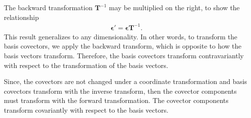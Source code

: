 The backward transformation $\mathbf{T}^{-1}$ may be multiplied on the right, to show the relationship
\begin{align}
  \boldsymbol\epsilon' = \boldsymbol\epsilon \mathbf{T}^{-1}.
\end{align}
This result generalizes to any dimensionality. In other words, to transform the basis covectors, we apply the backward transform, which is opposite to how the basis vectors transform. Therefore, the basis covectors transform contravariantly with respect to the transformation of the basis vectors.

Since, the covectors are not changed under a coordinate transformation and basis covectors transform with the inverse transform, then the covector components must transform with the forward transformation. The covector components transform covariantly with respect to the basis vectors.

